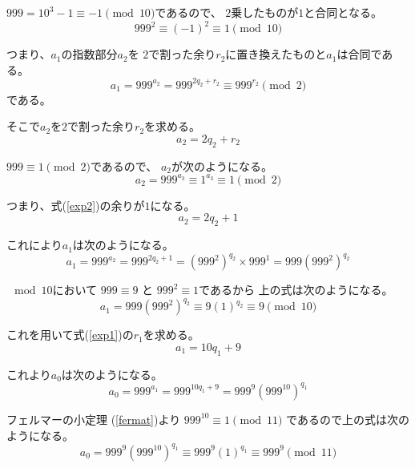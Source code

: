 \documentclass[12pt,b5paper]{ltjsarticle}
\begin{document}
$999 = 10^3-1\equiv -1\pmod{10}$であるので、
$2$乗したものが$1$と合同となる。
\begin{equation}
 999^2 \equiv (-1)^2 \equiv 1 \pmod{10}
\end{equation}

つまり、$a_{1}$の指数部分$a_{2}$を
$2$で割った余り$r_{2}$に置き換えたものと$a_{1}$は合同である。
\begin{equation}
 a_1 = 999^{a_2}= 999^{2q_{2}+r_{2}} \equiv 999^{r_{2}} \pmod{2}
\end{equation}
である。


そこで$a_2$を$2$で割った余り$r_{2}$を求める。
\begin{equation}
 a_2=2q_{2}+r_{2}
  \label{exp2}
\end{equation}

$999 \equiv 1 \pmod{2}$であるので、
$a_{2}$が次のようになる。
\begin{equation}
 a_2 = 999^{a_3} \equiv 1^{a_3} \equiv 1 \pmod{2}
\end{equation}

つまり、式(\ref{exp2})の余りが$1$になる。
\begin{equation}
 a_{2}=2q_{2}+1
\end{equation}

これにより$a_{1}$は次のようになる。
\begin{equation}
 a_{1}= 999^{a_{2}}
  = 999^{2q_{2}+1}
  = \left( 999^{2} \right)^{q_{2}}\times 999^{1}
  = 999\left( 999^{2} \right)^{q_{2}}
\end{equation}



$\mod{10}$において
$999\equiv 9$ と $999^2\equiv 1$であるから
上の式は次のようになる。
\begin{equation}
 a_{1}= 999\left( 999^{2} \right)^{q_{2}}
  \equiv 9(1)^{q_{2}} \equiv 9\pmod{10}
\end{equation}

これを用いて式(\ref{exp1})の$r_{1}$を求める。
\begin{equation}
 a_{1}=10q_{1}+9
\end{equation}

これより$a_{0}$は次のようになる。
\begin{equation}
 a_{0}= 999^{a_1}
  = 999^{10q_{1}+9}
  = 999^{9} \left( 999^{10} \right)^{q_{1}}
\end{equation}

フェルマーの小定理 (\ref{fermat})より
$999^{10}\equiv 1\pmod{11}$
であるので上の式は次のようになる。
\begin{equation}
 a_{0}= 999^{9} \left( 999^{10} \right)^{q_{1}}
  \equiv 999^{9} (1)^{q_{1}}
  \equiv 999^{9} \pmod{11}
\end{equation}
\end{document}
